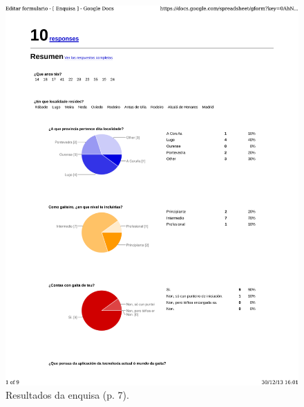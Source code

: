 \begin{figure}
 \centering
 \includegraphics[scale=0.7,page=7,keepaspectratio=true,clip,trim=0cm 0.5cm 0cm 0.5cm]{./imagenes/enquisa.pdf}
 \caption{Resultados da enquisa (p. 7).}
 \label{figura:ResultadosEnquisa7}
\end{figure}

